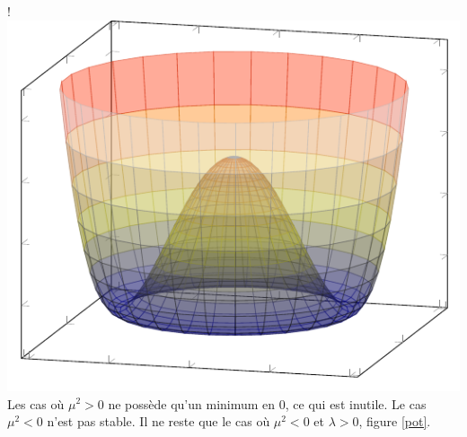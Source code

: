 {{}
\resizebox {\marginparwidth} {!} 
{
	\includegraphics[scale=1]{SM/mp.pdf}
}
\label{profile}
}
Les cas où $\mu^{2}>0$ ne possède qu'un minimum en $0$, ce qui est inutile. Le cas $\mu^{2}<0$ n'est pas stable. Il ne reste que le cas où $\mu^{2}<0$ et $\lambda>0$, figure \ref{pot}.

